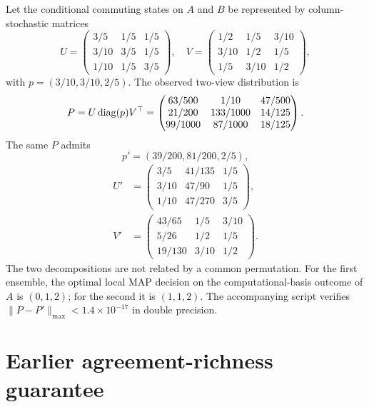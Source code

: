 Let the conditional commuting states on $A$ and $B$ be represented by column-stochastic matrices
\begin{equation}
U=\begin{pmatrix}
3/5&1/5&1/5\\
3/10&3/5&1/5\\
1/10&1/5&3/5
\end{pmatrix},\quad
V=\begin{pmatrix}
1/2&1/5&3/10\\
3/10&1/2&1/5\\
1/5&3/10&1/2
\end{pmatrix},
\end{equation}
with $p=(3/10,3/10,2/5)$.  The observed two-view distribution is
\begin{equation}
P=U\operatorname{diag}(p)V^\top
=\begin{pmatrix}
63/500&1/10&47/500\\
21/200&133/1000&14/125\\
99/1000&87/1000&18/125
\end{pmatrix}.
\end{equation}
The same $P$ admits
\begin{equation}
p'=(39/200,81/200,2/5),
\end{equation}
\begin{align}
U'&=\begin{pmatrix}
3/5&41/135&1/5\\
3/10&47/90&1/5\\
1/10&47/270&3/5
\end{pmatrix},\\[1mm]
V'&=\begin{pmatrix}
43/65&1/5&3/10\\
5/26&1/2&1/5\\
19/130&3/10&1/2
\end{pmatrix}.
\end{align}
The two decompositions are not related by a common permutation.  For the first ensemble, the optimal local MAP decision on the computational-basis outcome of $A$ is $(0,1,2)$; for the second it is $(1,1,2)$.  The accompanying script verifies $\|P-P'\|_{\max}<1.4\times10^{-17}$ in double precision.

\section{Earlier agreement-richness guarantee}
\label{app:agreement}

